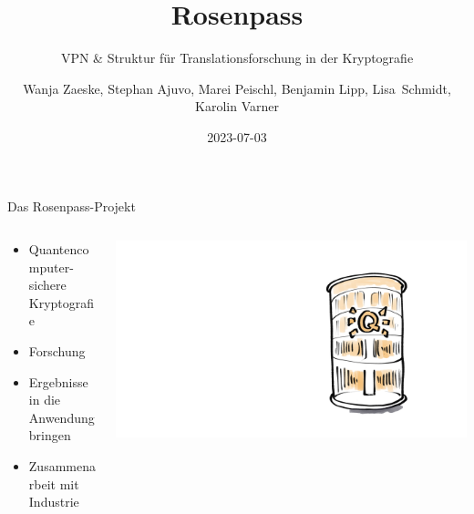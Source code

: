 \documentclass{rosenpass-beamer}
\title{Rosenpass}
\subtitle{VPN \& Struktur für Translationsforschung in der Kryptografie}
\author{
Wanja Zaeske, Stephan Ajuvo, Marei Peischl, Benjamin Lipp, Lisa~Schmidt, Karolin Varner
}
\institute{\url{https://rosenpass.eu}}
\date{2023-07-03}
\begin{document}
\maketitle

\begin{frame}{Das Rosenpass-Projekt}
\begin{columns}[c,onlytextwidth]
\begin{column}{.6\textwidth}
\begin{itemize}
  \item Quantencomputer-sichere Kryptografie
  \item Forschung
  \item Ergebnisse in die Anwendung bringen
  \item Zusammenarbeit mit Industrie
\end{itemize}
\end{column}
\begin{column}{.4\textwidth}
\centering
  \includegraphics[width=\linewidth]{graphics/qc.png}
\end{column}
\end{columns}
\end{frame}
\end{document}
